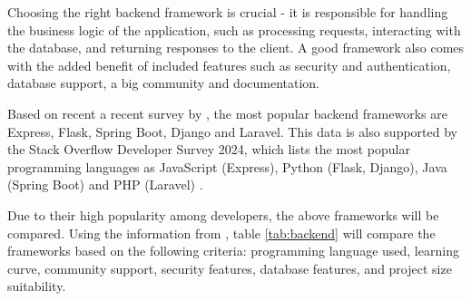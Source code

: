 Choosing the right backend framework is crucial - it is responsible for handling the business logic of the application, such as processing requests, interacting with the database, and returning responses to the client. A good framework also comes with the added benefit of included features such as security and authentication, database support, a big community and documentation. 

Based on recent a recent survey by \textcite{statista-webframeworks}, the most popular backend frameworks are Express, Flask, Spring Boot, Django and Laravel. This data is also supported by the Stack Overflow Developer Survey 2024, which lists the most popular programming languages as JavaScript (Express), Python (Flask, Django), Java (Spring Boot) and PHP (Laravel) \parencite{stackoverflow}. 

Due to their high popularity among developers, the above frameworks will be compared. Using the information from \textcite{spring,express,django,fastapi}, table \ref{tab:backend} will compare the frameworks based on the following criteria: programming language used, learning curve, community support, security features, database features, and project size suitability.

\begin{table}[h]
    \centering
    \caption{Comparison of backend frameworks}
    \label{tab:backend}
\end{table}

